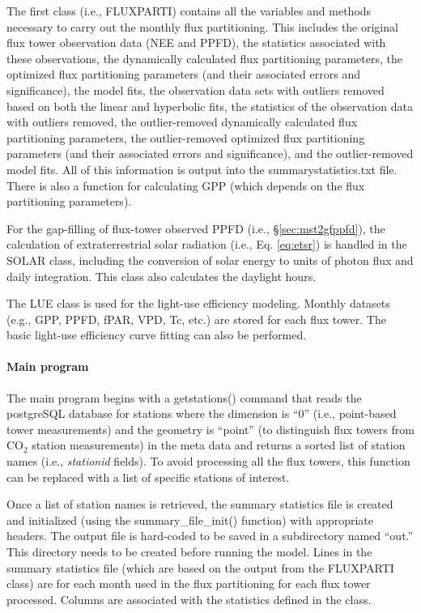 The first class (i.e., FLUX\textunderscore PARTI) contains all the variables and methods necessary to carry out the monthly flux partitioning.  
This includes the original flux tower observation data (NEE and PPFD), the statistics associated with these observations, the dynamically calculated flux partitioning parameters, the optimized flux partitioning parameters (and their associated errors and significance), the model fits, the observation data sets with outliers removed based on both the linear and hyperbolic fits, the statistics of the observation data with outliers removed, the outlier-removed dynamically calculated flux partitioning parameters, the outlier-removed optimized flux partitioning parameters (and their associated errors and significance), and the outlier-removed model fits.  
All of this information is output into the summary\textunderscore statistics.txt file.  
There is also a function for calculating GPP (which depends on the flux partitioning parameters).

For the gap-filling of flux-tower observed PPFD (i.e., \S \ref{sec:mst2gfppfd}), the calculation of extraterrestrial solar radiation (i.e., Eq. \ref{eq:etsr}) is handled in the SOLAR class, including the conversion of solar energy to units of photon flux and daily integration.  
This class also calculates the daylight hours.

The LUE class is used for the light-use efficiency modeling.  
Monthly datasets (e.g., GPP, PPFD, fPAR, VPD, Tc, etc.) are stored for each flux tower.  
The basic light-use efficiency curve fitting can also be performed.

\paragraph{Main program}
\label{par:modelmain}
The main program begins with a get\textunderscore stations() command that reads the postgreSQL database for stations where the dimension is ``0'' (i.e., point-based tower measurements) and the geometry is ``point'' (to distinguish flux towers from CO$_2$ station measurements) in the meta data and returns a sorted list of station names (i.e., \textit{stationid} fields).  
To avoid processing all the flux towers, this function can be replaced with a list of specific stations of interest.

Once a list of station names is retrieved, the summary statistics file is created and initialized (using the summary\_file\_init() function) with appropriate headers.  
The output file is hard-coded to be saved in a subdirectory named ``out.''  
This directory needs to be created before running the model. 
Lines in the summary statistics file (which are based on the output from the FLUX\textunderscore PARTI class) are for each month used in the flux partitioning for each flux tower processed.  
Columns are associated with the statistics defined in the class.

